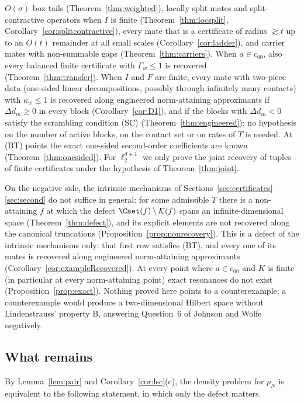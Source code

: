 $O(\sigma)$ box tails (Theorem~\ref{thm:weighted}), locally split mates and
split-contractive operators when $I$ is finite (Theorem~\ref{thm:locsplit},
Corollary~\ref{cor:splitcontractive}), every mate that is a certificate of
radius $\gtrsim t$ up to an $O(t)$ remainder at all small scales
(Corollary~\ref{cor:ladder}), and carrier mates with non-summable gaps
(Theorem~\ref{thm:carriers}).  When $a\in c_{00}$, also every balanced
finite certificate with $\Gamma_w\le1$ is recovered
(Theorem~\ref{thm:transfer}).  When $I$ and $F$ are finite, every mate with
two-piece data (one-sided linear decompositions, possibly through infinitely
many contacts) with $\kappa_w\le1$ is recovered along engineered
norm-attaining approximants if $\Delta d_m\ge0$ in every block
(Corollary~\ref{cor:D1}), and if the blocks with $\Delta d_m<0$ satisfy the
scrambling condition \textup{(SC)} (Theorem~\ref{thm:engineered}); no
hypothesis on the number of active blocks, on the contact set or on rates of
$T$ is needed.  At \textup{(BT)} points the exact one-sided second-order
coefficients are known (Theorem~\ref{thm:onesided}).  For $\ell_2^{d+1}$ we
only prove the joint recovery of tuples of finite certificates under the
hypothesis of Theorem~\ref{thm:joint}.

On the negative side, the intrinsic mechanisms of
Sections~\ref{sec:certificates}--\ref{sec:second} do not suffice in general:
for some admissible $T$ there is a non-attaining $f$ at which the defect
$\Cset(f)\setminus\mathcal K(f)$ spans an infinite-dimensional space
(Theorem~\ref{thm:defect}), and its explicit elements are not recovered
along the canonical truncations (Proposition~\ref{prop:nonrecovery}).  This
is a defect of the intrinsic mechanisms only: that first row satisfies
\textup{(BT)}, and every one of its mates is recovered along engineered
norm-attaining approximants (Corollary~\ref{cor:exampleRecovered}).  At
every point where $a\in c_{00}$ and $K$ is finite (in particular at every
norm-attaining point) exact resonances do not exist
(Proposition~\ref{prop:exact}).  Nothing proved here points to a
counterexample; a counterexample would produce a two-dimensional Hilbert
space without Lindenstrauss' property B, answering Question~6 of Johnson and
Wolfe \cite{JW} negatively.

\subsection{What remains}
By Lemma~\ref{lem:pair} and Corollary~\ref{cor:lsc}(c), the density problem
for $p_N$ is equivalent to the following statement, in which only the defect
matters.

